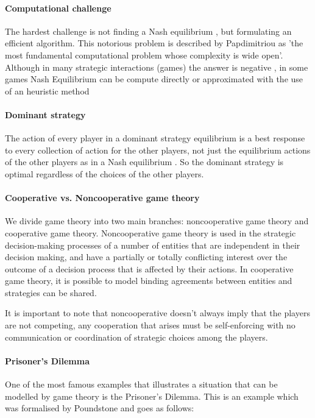 \paragraph{Computational challenge} 
The hardest challenge is not finding a Nash equilibrium , but formulating an efficient algorithm. This notorious problem is described by Papdimitriou as 'the most fundamental computational problem whose complexity is wide open'\cite{daskalakis2009complexity}.  Although in many strategic interactions (games) the answer is negative , in some games Nash Equilibrium can be compute directly or approximated with the use of an heuristic method\cite{MicrogridModellingPetrosAristidou,AumannGameTheoryAccomplish} 

\paragraph{Dominant strategy} 
The action of every player in a dominant strategy equilibrium is a best response to every collection of action for the other players, not just the equilibrium actions of the other players as in a Nash equilibrium \cite{CourseInGameTheory}. So the dominant strategy is optimal regardless of the choices of the other players.

\paragraph{Cooperative vs. Noncooperative game theory} 
We divide game theory into two main branches: noncooperative game theory and cooperative game theory. Noncooperative game theory is used in the strategic decision-making processes of a number of entities that are independent in their decision making, and have a partially or totally conflicting interest over the outcome of a decision process that is affected by their actions\cite{keypaper}. In cooperative game theory, it is possible to model binding agreements between entities and strategies can be shared. 

It is important to note that noncooperative doesn't always imply that the players are not competing, any cooperation that arises must be self-enforcing with no communication or coordination of strategic choices among the players.\cite{keypaper}

\paragraph{Prisoner's Dilemma}
One of the most famous examples that illustrates a situation that can be modelled by game theory is the Prisoner's Dilemma. This is an example which was formalised by Poundstone \cite{poundstone} and goes as follows: 

